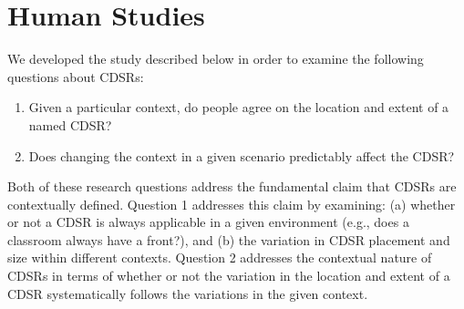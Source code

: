 \documentclass[11pt,letterpaper]{article}
\begin{document}


\section{Human Studies}

We developed the study described below in order to examine the following questions about CDSRs:
\begin{enumerate}
	\item Given a particular context, do people agree on the location and extent of a named CDSR?
	\item Does changing the context in a given scenario predictably affect the CDSR?
\end{enumerate}

Both of these research questions address the fundamental claim that CDSRs are contextually defined. Question 1 addresses this claim by examining: (a) whether or not a CDSR is always applicable in a given environment (e.g., does a classroom always have a front?), and (b) the variation in CDSR placement and size within different contexts. Question 2 addresses the contextual nature of CDSRs in terms of whether or not the variation in the location and extent of a CDSR systematically follows the variations  in the given context. 

\end{document}
